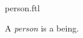 \documentclass{stex}
\begin{document}
\begin{smodule}{person.ftl}

  \begin{signature}[forthel]
    A \emph{person} is a being.
  \end{signature}
\end{smodule}
\end{document}
